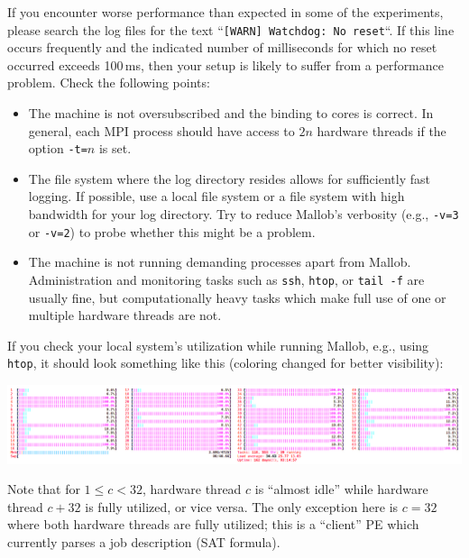 \documentclass[runningheads]{article}
\numberwithin{dummy}{subsection}
\begin{document}
If you encounter worse performance than expected in some of the experiments, please search the log files for the text ``\texttt{[WARN] Watchdog: No reset}``.
If this line occurs frequently and the indicated number of milliseconds for which no reset occurred exceeds 100\,ms, then your setup is likely to suffer from a performance problem.
Check the following points:
\begin{itemize}
\item The machine is not oversubscribed and the binding to cores is correct. In general, each MPI process should have access to $2n$ hardware threads if the option \texttt{-t=}$n$ is set.
\item The file system where the log directory resides allows for sufficiently fast logging. If possible, use a local file system or a file system with high bandwidth for your log directory. Try to reduce Mallob's verbosity (e.g., \texttt{-v=3} or \texttt{-v=2}) to probe whether this might be a problem.
\item The machine is not running demanding processes apart from Mallob.
Administration and monitoring tasks such as \texttt{ssh}, \texttt{htop}, or \texttt{tail -f} are usually fine, but computationally heavy tasks which make full use of one or multiple hardware threads are not.
\end{itemize}

If you check your local system's utilization while running Mallob, e.g., using \texttt{htop}, it should look something like this (coloring changed for better visibility):
\begin{center}
\includegraphics[width=\textwidth]{../sample-output/htop-32cores.png}
\end{center}
Note that for $1 \leq c < 32$, hardware thread $c$ is ``almost idle'' while hardware thread $c+32$ is fully utilized, or vice versa.
The only exception here is $c=32$ where both hardware threads are fully utilized; this is a ``client'' PE which currently parses a job description (SAT formula).





%
%
%
%
%
%
\end{document}
